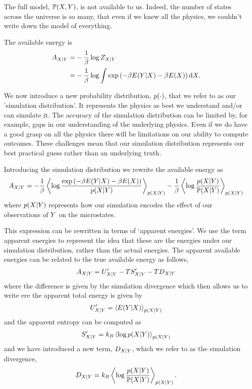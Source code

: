 \documentclass[]{article}
\begin{document}
The full model, \(\mathbb{P}(X, Y)\), is not
available to us. Indeed, the number of states across the universe is so
many, that even if we knew all the physics, we couldn't write down the
model of everything.

The available energy is 
\begin{align*}
A_{X|Y} = & -\frac{1}{\beta} \log Z_{X|Y} \\
= & -\frac{1}{\beta} \log \int \exp\left(-\beta E(Y|X) -\beta E(X)\right) \text{d}X.
\end{align*}

We now introduce a new probability distribution,  \(p(\cdot)\), that we refer to as our 'simulation distribution'. It represents the physics as best we understand and/or can simulate it. The accuracy of the simulation distribution can be limited by, for example, gaps in our understanding of the underlying physics. Even if we do have a good grasp on all the physics there will be limitations on our ability to compute outcomes. These challenges mean that our simulation distribution represents our best practical guess rather than an underlying truth.

Introducing the simulation distribution we rewrite the available energy as
\[
A_{X|Y} =  -\frac{1}{\beta}\left\langle \log \frac{\exp\left(-\beta E(Y|X) -\beta E(X)\right)}{p(X|Y) } \right\rangle_{p(X|Y) } - \frac{1}{\beta}\left\langle \log \frac{p(X|Y)}{\mathbb{P}(X|Y) } \right\rangle_{p(X|Y) }
\] 
where \(p(X|Y)\) represents how our simulation encodes the effect of our  observations of \(Y\) on the microstates.

This expression can be rewritten in terms of `apparent energies'. We use the term apparent energies to represent the idea that these are the energies under our simulation distribution, rather than the actual energies. The apparent available energies can be related to the true available energy as follows, 
\[
A_{X|Y} = U^\prime_{X|Y} - TS^\prime_{X|Y} - TD_{X|Y}
\] 
where the difference is given by the simulation divergence
which then allows us to write ere the apparent total energy is given by 
\[
U^\prime_{X|Y} = \left\langle E(Y|X) \right\rangle_{p(X|Y) } 
\] and the apparent entropy can be computed as \[
S^\prime_{X|Y}=k_B\left\langle \log p(X|Y)  \right\rangle_{p(X|Y) }
\] and we have introduced a new term,
\(D_{X|Y}\), which we refer to as the simulation
divergence, 
\[
D_{X|Y} = k_B \left\langle \log \frac{p(X| Y)}{\mathbb{P}(X|Y) } \right\rangle_{p(X|Y) }.
\]
\end{document}
